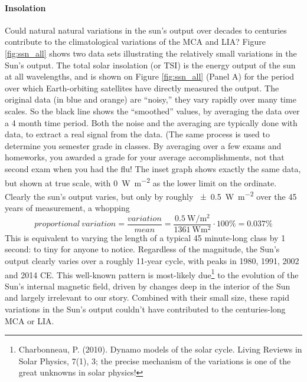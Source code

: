 \documentclass[amstex,12pt]{book}
\begin{document}
\paragraph{Insolation}
Could natural natural variations in the sun’s output over decades to centuries contribute to the climatological variations of the MCA and LIA? Figure \ref{fig:ssn_all} shows two data sets illustrating the relatively small variations in the Sun's output. The total solar insolation (or TSI) is the energy output of the sun at all wavelengths, and is shown on Figure \ref{fig:ssn_all} (Panel A) for the period over which Earth-orbiting satellites have directly measured the output. The original data (in blue and orange) are ``noisy,'' they vary rapidly over many time scales. So the black line shows the ``smoothed'' values, by averaging the data over a 4 month time period. Both the noise and the averaging are typically done with data, to extract a real signal from the data. (The same process is used to determine you semester grade in classes. By averaging over a few exams and homeworks, you awarded a grade for your average accomplishments, not that second exam when you had the flu! The inset graph shows exactly the same data, but shown at true scale, with \SI{0}{\watt\per\metre\squared} as the lower limit on the ordinate. Clearly the sun’s output varies, but only by roughly \SI{\pm 0.5}{\watt\per\metre\squared} over the 45 years of measurement, a whopping
\begin{equation}
	proportional\ variation=\frac{variation}{mean}=\frac{\SI{0.5}{\watt\per\metre\squared}}{\SI{1361}{\watt\metre\squared}}\cdot100\%=0.037\%
\end{equation}
This is equivalent to varying the length of a typical 45 minute-long class by 1 second: to tiny for anyone to notice. Regardless of the magnitude, the Sun's output clearly varies over a roughly 11-year cycle, with peaks in 1980, 1991, 2002 and 2014 CE. This well-known pattern is most-likely due\footnote{Charbonneau, P. (2010). Dynamo models of the solar cycle. Living Reviews in Solar Physics, 7(1), 3; the precise mechanism of the variations is one of the great unknowns in solar physics!} to the evolution of the Sun's internal magnetic field, driven by changes deep in the interior of the Sun and largely irrelevant to our story. Combined with their small size, these rapid variations in the Sun's output couldn't have contributed to the centuries-long MCA or LIA.\\
\end{document}
